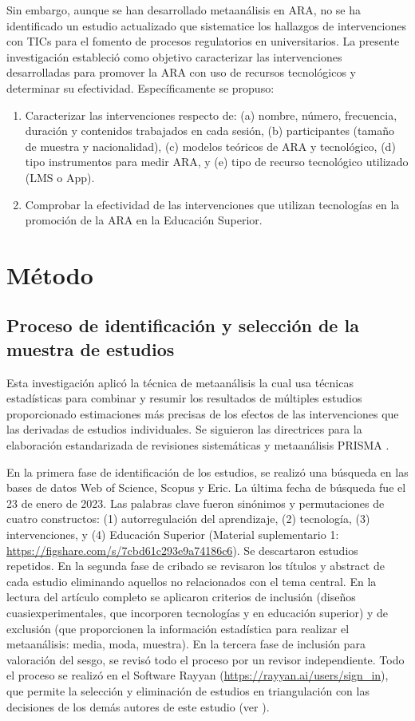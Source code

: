 \documentclass[spanish]{textolivre}
\begin{document}
Sin embargo, aunque se han desarrollado metaanálisis en ARA, no se ha identificado un estudio actualizado que sistematice los hallazgos de intervenciones con TICs para el fomento de procesos regulatorios en universitarios. La presente investigación estableció como objetivo caracterizar las intervenciones desarrolladas para promover la ARA con uso de recursos tecnológicos y determinar su efectividad. Específicamente se propuso: 

\begin{enumerate}
    \item Caracterizar las intervenciones respecto de: (a) nombre, número, frecuencia, duración y contenidos trabajados en cada sesión, (b) participantes (tamaño de muestra y nacionalidad), (c) modelos teóricos de ARA y tecnológico, (d) tipo instrumentos para medir ARA, y (e) tipo de recurso tecnológico utilizado (LMS o App). 
    \item Comprobar la efectividad de las intervenciones que utilizan tecnologías en la promoción de la ARA en la Educación Superior.
\end{enumerate}

\section{Método}

\subsection{Proceso de identificación y selección de la muestra de estudios }

Esta investigación aplicó la técnica de metaanálisis la cual usa técnicas estadísticas para combinar y resumir los resultados de múltiples estudios proporcionado estimaciones más precisas de los efectos de las intervenciones que las derivadas de estudios individuales. Se siguieron las directrices para la elaboración estandarizada de revisiones sistemáticas y metaanálisis PRISMA \cite{moher2015preferred}.

En la primera fase de identificación de los estudios, se realizó una búsqueda en las bases de datos Web of Science, Scopus y Eric. La última fecha de búsqueda fue el 23 de enero de 2023. Las palabras clave fueron sinónimos y permutaciones de cuatro constructos: (1) autorregulación del aprendizaje, (2) tecnología, (3) intervenciones, y (4) Educación Superior (Material suplementario 1: \url{https://figshare.com/s/7cbd61c293e9a74186c6}). Se descartaron estudios repetidos. En la segunda fase de cribado se revisaron los títulos y abstract de cada estudio eliminando aquellos no relacionados con el tema central. En la lectura del artículo completo se aplicaron criterios de inclusión (diseños cuasiexperimentales, que incorporen tecnologías y en educación superior) y de exclusión (que proporcionen la información estadística para realizar el metaanálisis: media, moda, muestra). En la tercera fase de inclusión para valoración del sesgo, se revisó todo el proceso por un revisor independiente. Todo el proceso se realizó en el Software Rayyan (\url{https://rayyan.ai/users/sign_in}), que permite la selección y eliminación de estudios en triangulación con las decisiones de los demás autores de este estudio (ver ). 
\end{document}
